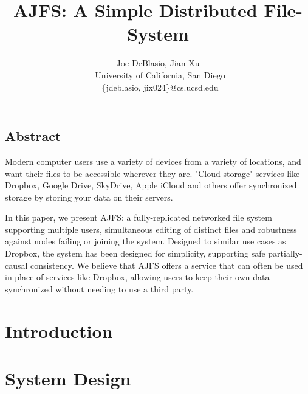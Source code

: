 \documentclass[letterpaper,twocolumn,10pt]{article}
\begin{document}

\date{}

\title{\Large \bf AJFS: A Simple Distributed File-System}

\author{
    {\rm Joe DeBlasio, Jian Xu}\\\
    University of California, San Diego\\\
    \{jdeblasio, jix024\}@cs.ucsd.edu}

\maketitle

\thispagestyle{empty}

\subsection*{Abstract}
    Modern computer users use a variety of devices from a variety of locations,
and want their files to be accessible wherever they are. "Cloud storage"
services like Dropbox, Google Drive, SkyDrive, Apple iCloud and others offer
synchronized storage by storing your data on their servers.

    In this paper, we present AJFS: a fully-replicated networked file system
supporting multiple users, simultaneous editing of distinct files and robustness
against nodes failing or joining the system. Designed to similar use cases as
Dropbox, the system has been designed for simplicity, supporting safe
partially-causal consistency. We believe that AJFS offers a service that can
often be used in place of services like Dropbox, allowing users to keep their
own data synchronized without needing to use a third party.

\section{Introduction}
\label{sec:introduction}


\section{System Design}
\label{sec:designOverview}

\end{document}
